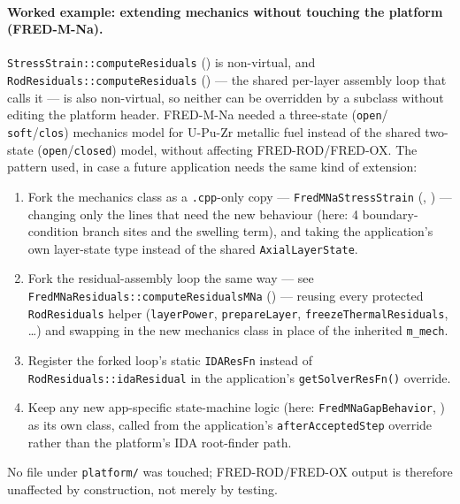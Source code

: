 \documentclass[11pt,a4paper]{article}
\begin{document}
\paragraph{Worked example: extending mechanics without touching the platform (FRED-M-Na).}
\texttt{StressStrain::computeResiduals} () is
non-virtual, and \texttt{RodResiduals::computeResiduals}
() — the shared per-layer assembly loop that calls
it — is also non-virtual, so neither can be overridden by a subclass without
editing the platform header. FRED-M-Na needed a three-state (\texttt{open}/
\texttt{soft}/\texttt{clos}) mechanics model for U-Pu-Zr metallic fuel instead
of the shared two-state (\texttt{open}/\texttt{closed}) model, without
affecting FRED-ROD/FRED-OX. The pattern used, in case a future application
needs the same kind of extension:
\begin{enumerate}
  \item Fork the mechanics class as a \texttt{.cpp}-only copy —
    \texttt{FredMNaStressStrain} (,
    ) — changing only the lines
    that need the new behaviour (here: 4 boundary-condition branch sites and
    the swelling term), and taking the application's own layer-state type
    instead of the shared \texttt{AxialLayerState}.
  \item Fork the residual-assembly loop the same way — see
    \texttt{FredMNaResiduals::computeResidualsMNa}
    () — reusing every protected
    \texttt{RodResiduals} helper (\texttt{layerPower}, \texttt{prepareLayer},
    \texttt{freezeThermalResiduals}, \ldots) and swapping in the new
    mechanics class in place of the inherited \texttt{m\_mech}.
  \item Register the forked loop's static \texttt{IDAResFn} instead of
    \texttt{RodResiduals::idaResidual} in the application's
    \texttt{getSolverResFn()} override.
  \item Keep any new app-specific state-machine logic (here:
    \texttt{FredMNaGapBehavior}, ) as its own
    class, called from the application's \texttt{afterAcceptedStep} override
    rather than the platform's IDA root-finder path.
\end{enumerate}
No file under \texttt{platform/} was touched; FRED-ROD/FRED-OX output is
therefore unaffected by construction, not merely by testing.

\end{document}
